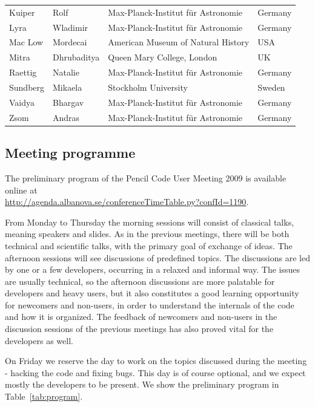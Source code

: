 \documentclass{article}
\begin{document}
\begin{table}
\begin{center}
\begin{tabular}{llll}
    Kuiper      &  Rolf        &  Max-Planck-Institut f\"ur Astronomie & Germany\\
    Lyra        &  Wladimir    &  Max-Planck-Institut f\"ur Astronomie & Germany\\
    Mac Low     &  Mordecai    &  American Museum of Natural History & USA\\
    Mitra       &  Dhrubaditya &  Queen Mary College, London & UK \\
    Raettig     &  Natalie     &  Max-Planck-Institut f\"ur Astronomie & Germany\\
    Sundberg    &  Mikaela     &  Stockholm University & Sweden\\
    Vaidya      &  Bhargav     &  Max-Planck-Institut f\"ur Astronomie & Germany\\
    Zsom        &  Andras      &  Max-Planck-Institut f\"ur Astronomie & Germany\\\hline  
\end{tabular}
\end{center}
\end{table}

\subsection*{Meeting programme}

The preliminary program of the {\sc Pencil Code} User Meeting 2009 is available online at \\

\url{http://agenda.albanova.se/conferenceTimeTable.py?confId=1190}. 

From Monday 
to Thursday the morning sessions will consist of classical talks, meaning speakers 
and slides. As in the previous meetings, there will be both technical and scientific 
talks, with the primary goal of exchange of ideas. The afternoon sessions will see 
discussions of predefined topics. The discussions are led by one or a few
developers, occurring 
in a relaxed and informal way. The issues are usually technical, so the afternoon discussions 
are more palatable for developers and heavy users, but it also constitutes a good 
learning opportunity for newcomers and non-users, in order to understand the 
internals of the code and how it is organized. The feedback of newcomers and non-users 
in the discussion sessions of the previous meetings has also proved vital for the 
developers as well.

On Friday we reserve the day to work on the topics discussed during the meeting - hacking the 
code and fixing bugs. This day is of course optional, and we expect mostly the developers to be 
present. We show the preliminary program in Table~\ref{tab:program}.
\\ 
\end{document}
